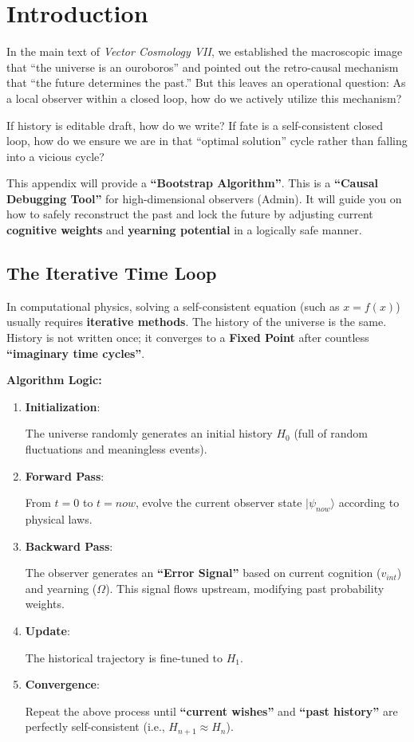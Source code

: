 \section{Introduction}

In the main text of \textit{Vector Cosmology VII}, we established the macroscopic image that ``the universe is an ouroboros'' and pointed out the retro-causal mechanism that ``the future determines the past.'' But this leaves an operational question: As a local observer within a closed loop, how do we actively utilize this mechanism?

If history is editable draft, how do we write? If fate is a self-consistent closed loop, how do we ensure we are in that ``optimal solution'' cycle rather than falling into a vicious cycle?

This appendix will provide a \textbf{``Bootstrap Algorithm''}. This is a \textbf{``Causal Debugging Tool''} for high-dimensional observers (Admin). It will guide you on how to safely reconstruct the past and lock the future by adjusting current \textbf{cognitive weights} and \textbf{yearning potential} in a logically safe manner.

\subsection{The Iterative Time Loop}

In computational physics, solving a self-consistent equation (such as $x = f(x)$) usually requires \textbf{iterative methods}. The history of the universe is the same. History is not written once; it converges to a \textbf{Fixed Point} after countless \textbf{``imaginary time cycles''}.

\textbf{Algorithm Logic:}

\begin{enumerate}
\item \textbf{Initialization}:

The universe randomly generates an initial history $H_0$ (full of random fluctuations and meaningless events).

\item \textbf{Forward Pass}:

From $t=0$ to $t=now$, evolve the current observer state $|\psi_{now}\rangle$ according to physical laws.

\item \textbf{Backward Pass}:

The observer generates an \textbf{``Error Signal''} based on current cognition ($v_{int}$) and yearning ($\Omega$). This signal flows upstream, modifying past probability weights.

\item \textbf{Update}:

The historical trajectory is fine-tuned to $H_1$.

\item \textbf{Convergence}:

Repeat the above process until \textbf{``current wishes''} and \textbf{``past history''} are perfectly self-consistent (i.e., $H_{n+1} \approx H_n$).
\end{enumerate}

